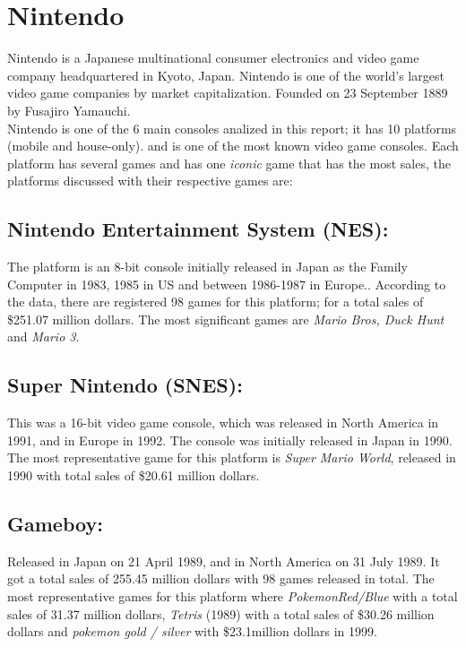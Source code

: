 \section{Nintendo}
Nintendo is a Japanese multinational consumer electronics and video game company
headquartered in Kyoto, Japan. Nintendo is one of the world's largest video
game companies by market capitalization. Founded on 23 September 1889
by Fusajiro Yamauchi\cite{Nintendo}.\\

Nintendo is one of the 6 main consoles analized in this report; it has 10
platforms (mobile and house-only). and is one of the most known
video game consoles. Each platform has several games and has one
\textit{iconic} game that has the most sales, the platforms discussed with
their respective games are:\\

\subsection{Nintendo Entertainment System (NES):} The platform is an 8-bit
console initially released in Japan as the Family Computer in 1983, 1985 in
US and between 1986-1987 in Europe.\cite{Nintendo}. According to the data,
there are registered 98 games for this platform; for a total sales of \$251.07
million dollars. The most significant games are \textit{Mario Bros, Duck Hunt} and
\textit{Mario 3}.\\
\subsection{Super Nintendo (SNES):} This was a 16-bit video game console,
which was released in North America in 1991, and in Europe in 1992. The
console was initially released in Japan in 1990\cite{Nintendo}. The most
representative game for this platform is \textit{Super Mario World}, released in 1990
with total sales of \$20.61 million dollars.\\
\subsection{Gameboy:} Released in Japan on 21 April 1989, and in
North America on 31 July 1989\cite{Nintendo}. It got a total sales of 255.45
million dollars with 98 games released in total. The most representative games
for this platform where \textit{PokemonRed/Blue} with a total sales of 31.37 million
dollars, \textit{Tetris} (1989) with a total sales of \$30.26 million dollars and \textit{pokemon
gold / silver} with \$23.1million dollars in 1999.\\
